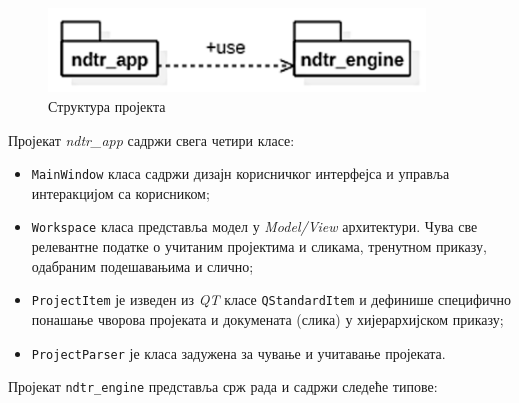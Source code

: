 \documentclass[11pt,a4paper,serbian,oneside]{book}
\begin{document}
\begin{figure}[H]
\begin{center}
\includegraphics[width=100mm]{images/struktura.png}
\end{center}
\caption{Структура пројекта}
\label{fig:struktura}
\end{figure}

Пројекат \textit{ndtr\_app} садржи свега четири класе:

\begin{itemize}
  \item \texttt{MainWindow} класа садржи дизајн корисничког интерфејса и управља интеракцијом са корисником;
  \item \texttt{Workspace} класа представља модел у \textit{Model/View} архитектури. Чува све релевантне податке о учитаним пројектима и сликама, тренутном приказу, одабраним по\-де\-ша\-ва\-њи\-ма и слично;
  \item \texttt{ProjectItem} је изведен из \textit{QT} класе \texttt{QStandardItem} и дефинише специфично по\-на\-ша\-ње чворова пројеката и докумената (слика) у хијерархијском приказу;
  \item \texttt{ProjectParser} је класа задужена за чување и учитавање пројеката.
\end{itemize}

Пројекат \texttt{ndtr\_engine} представља срж рада и садржи следеће типове:
\end{document}

